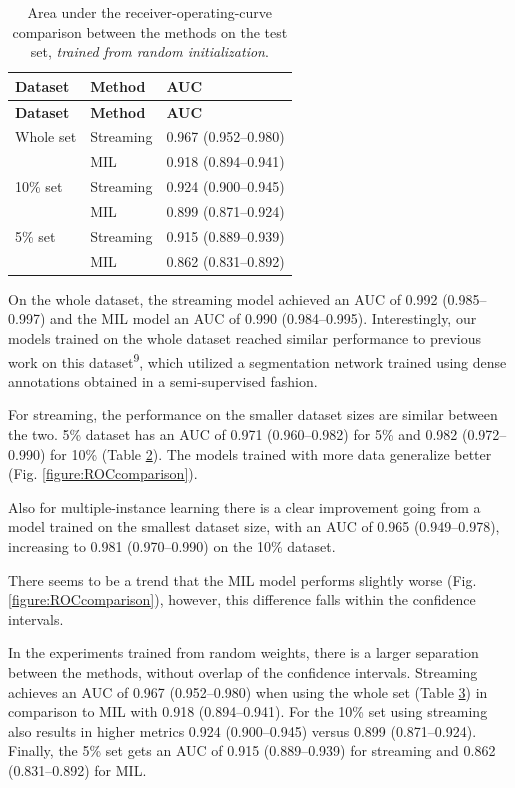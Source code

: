 \documentclass[
  12pt,
  a5,margin=2cmpaper,
]{article}
\begin{document}
\hypertarget{tab:test_results_scratch}{}
\begin{longtable}[]{@{}lll@{}}
\caption{Area under the receiver-operating-curve comparison between the
methods on the test set, \emph{trained from random
initialization}.}\tabularnewline
\toprule\noalign{}
\textbf{Dataset} & \textbf{Method} & \textbf{AUC} \\
\midrule\noalign{}
\endfirsthead
\toprule\noalign{}
\textbf{Dataset} & \textbf{Method} & \textbf{AUC} \\
\midrule\noalign{}
\endhead
\bottomrule\noalign{}
\endlastfoot
Whole set & Streaming & 0.967 (0.952--0.980) \\
& MIL & 0.918 (0.894--0.941) \\
10\% set & Streaming & 0.924 (0.900--0.945) \\
& MIL & 0.899 (0.871--0.924) \\
5\% set & Streaming & 0.915 (0.889--0.939) \\
& MIL & 0.862 (0.831--0.892) \\
\end{longtable}

On the whole dataset, the streaming model achieved an AUC of 0.992
(0.985--0.997) and the MIL model an AUC of 0.990 (0.984--0.995).
Interestingly, our models trained on the whole dataset reached similar
performance to previous work on this dataset\textsuperscript{9}, which
utilized a segmentation network trained using dense annotations obtained
in a semi-supervised fashion.

For streaming, the performance on the smaller dataset sizes are similar
between the two. 5\% dataset has an AUC of 0.971 (0.960--0.982) for 5\%
and 0.982 (0.972--0.990) for 10\% (Table
\protect\hyperlink{tab:test_results}{2}). The models trained with more
data generalize better (Fig.
\protect\hyperlink{figure:ROCcomparison}{{[}figure:ROCcomparison{]}}).

Also for multiple-instance learning there is a clear improvement going
from a model trained on the smallest dataset size, with an AUC of 0.965
(0.949--0.978), increasing to 0.981 (0.970--0.990) on the 10\% dataset.

There seems to be a trend that the MIL model performs slightly worse
(Fig.
\protect\hyperlink{figure:ROCcomparison}{{[}figure:ROCcomparison{]}}),
however, this difference falls within the confidence intervals.

In the experiments trained from random weights, there is a larger
separation between the methods, without overlap of the confidence
intervals. Streaming achieves an AUC of 0.967 (0.952--0.980) when using
the whole set (Table \protect\hyperlink{tab:test_results_scratch}{3}) in
comparison to MIL with 0.918 (0.894--0.941). For the 10\% set using
streaming also results in higher metrics 0.924 (0.900--0.945) versus
0.899 (0.871--0.924). Finally, the 5\% set gets an AUC of 0.915
(0.889--0.939) for streaming and 0.862 (0.831--0.892) for MIL.
\end{document}
